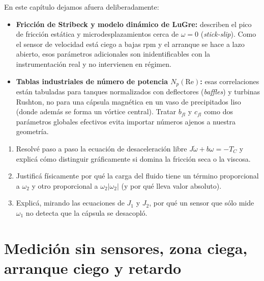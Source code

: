 \documentclass[11pt,a4paper,oneside]{book}
\begin{document}
\begin{antidoto}
En este capítulo dejamos afuera deliberadamente:
\begin{itemize}
  \item \textbf{Fricción de Stribeck y modelo dinámico de LuGre:} describen el
        pico de fricción estática y microdesplazamientos cerca de $\omega = 0$
        (\emph{stick-slip}). Como el sensor de velocidad está ciego a bajas rpm
        y el arranque se hace a lazo abierto, esos parámetros adicionales son
        inidentificables con la instrumentación real y no intervienen en régimen.
  \item \textbf{Tablas industriales de número de potencia $N_p(\mathrm{Re})$:}
        esas correlaciones están tabuladas para tanques normalizados con
        deflectores (\emph{baffles}) y turbinas Rushton, no para una cápsula
        magnética en un vaso de precipitados liso (donde además se forma un
        vórtice central). Tratar $b_{fl}$ y $c_{fl}$ como dos parámetros globales
        efectivos evita importar números ajenos a nuestra geometría.
\end{itemize}
\end{antidoto}

\begin{lapizypapel}
\begin{enumerate}[leftmargin=1.5em]
  \item Resolvé paso a paso la ecuación de desaceleración libre
        $J\dot\omega + b\omega = -T_C$ y explicá cómo distinguir gráficamente si
        domina la fricción seca o la viscosa.
  \item Justificá físicamente por qué la carga del fluido tiene un término
        proporcional a $\omega_2$ y otro proporcional a $\omega_2|\omega_2|$
        (y por qué lleva valor absoluto).
  \item Explicá, mirando las ecuaciones de $J_1$ y $J_2$, por qué un sensor
        que sólo mide $\omega_1$ no detecta que la cápsula se desacopló.
\end{enumerate}
\end{lapizypapel}

\chapter{Medición sin sensores, zona ciega, arranque ciego y retardo}\label{cap:sensorless}
\end{document}
